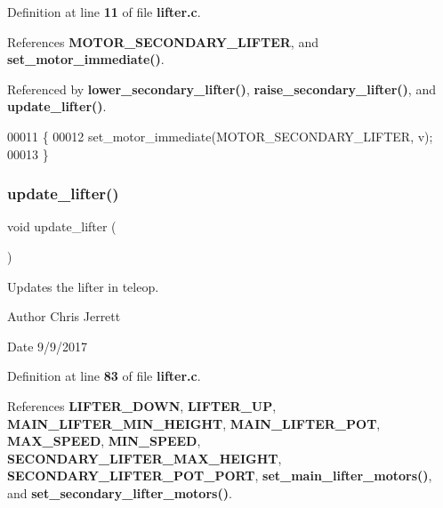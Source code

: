 Definition at line \textbf{ 11} of file \textbf{ lifter.\+c}.



References \textbf{ M\+O\+T\+O\+R\+\_\+\+S\+E\+C\+O\+N\+D\+A\+R\+Y\+\_\+\+L\+I\+F\+T\+ER}, and \textbf{ set\+\_\+motor\+\_\+immediate()}.



Referenced by \textbf{ lower\+\_\+secondary\+\_\+lifter()}, \textbf{ raise\+\_\+secondary\+\_\+lifter()}, and \textbf{ update\+\_\+lifter()}.


\begin{DoxyCode}
00011                                               \{
00012   set_motor_immediate(MOTOR_SECONDARY_LIFTER, v);
00013 \}
\end{DoxyCode}
\mbox{\label{lifter_8h_a59bb7413777ca16aba124aaedf95c79b}} 
\subsubsection{update\+\_\+lifter()}
{\footnotesize\ttfamily void update\+\_\+lifter (\begin{DoxyParamCaption}{ }\end{DoxyParamCaption})}



Updates the lifter in teleop. 

\begin{DoxyAuthor}{Author}
Chris Jerrett 
\end{DoxyAuthor}
\begin{DoxyDate}{Date}
9/9/2017 
\end{DoxyDate}


Definition at line \textbf{ 83} of file \textbf{ lifter.\+c}.



References \textbf{ L\+I\+F\+T\+E\+R\+\_\+\+D\+O\+WN}, \textbf{ L\+I\+F\+T\+E\+R\+\_\+\+UP}, \textbf{ M\+A\+I\+N\+\_\+\+L\+I\+F\+T\+E\+R\+\_\+\+M\+I\+N\+\_\+\+H\+E\+I\+G\+HT}, \textbf{ M\+A\+I\+N\+\_\+\+L\+I\+F\+T\+E\+R\+\_\+\+P\+OT}, \textbf{ M\+A\+X\+\_\+\+S\+P\+E\+ED}, \textbf{ M\+I\+N\+\_\+\+S\+P\+E\+ED}, \textbf{ S\+E\+C\+O\+N\+D\+A\+R\+Y\+\_\+\+L\+I\+F\+T\+E\+R\+\_\+\+M\+A\+X\+\_\+\+H\+E\+I\+G\+HT}, \textbf{ S\+E\+C\+O\+N\+D\+A\+R\+Y\+\_\+\+L\+I\+F\+T\+E\+R\+\_\+\+P\+O\+T\+\_\+\+P\+O\+RT}, \textbf{ set\+\_\+main\+\_\+lifter\+\_\+motors()}, and \textbf{ set\+\_\+secondary\+\_\+lifter\+\_\+motors()}.



